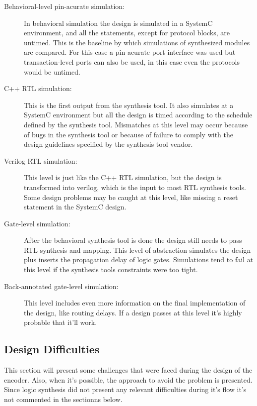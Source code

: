 \documentclass[a4paper, 12pt]{article}
\begin{document}
\begin{description}
\item[Behavioral-level pin-acurate simulation:] In behavioral simulation the design is simulated in a SystemC environment, and all the statements, except for protocol blocks, are untimed. This is the baseline by which simulations of synthesized modules are compared. For this case a pin-acurate port interface was used but transaction-level ports can also be used, in this case  even the protocols would be untimed.

\item[C++ RTL simulation:] This is the first output from the synthesis tool. It also simulates at a SystemC environment but all the design is timed according to the schedule defined by the synthesis tool. Mismatches at this level may occur because of bugs in the synthesis tool or because of failure to comply with the design guidelines specified by the synthesis tool vendor.

\item[Verilog RTL simulation:] This level is just like the C++ RTL simulation, but the design is transformed into verilog, which is the input to most RTL synthesis tools. Some design problems may be caught at this level, like missing a reset statement in the SystemC design.

\item[Gate-level simulation:] After the behavioral synthesis tool is done the design still needs to pass RTL synthesis and mapping. This level of abstraction simulates the design plus inserts the propagation delay of logic gates. Simulations tend to fail at this level if the synthesis tools constraints were too tight.

\item[Back-annotated gate-level simulation:] This level includes even more information on the final implementation of the design, like routing delays. If a design passes at this level it's highly probable that it'll work.
\end{description}


\subsection{Design Difficulties}

This section will present some challenges that were faced during the design of the encoder. Also, when it's possible, the approach to avoid the problem is presented. Since logic synthesis did not present any relevant difficulties during it's flow it's not commented in the sectionns below.
\end{document}
